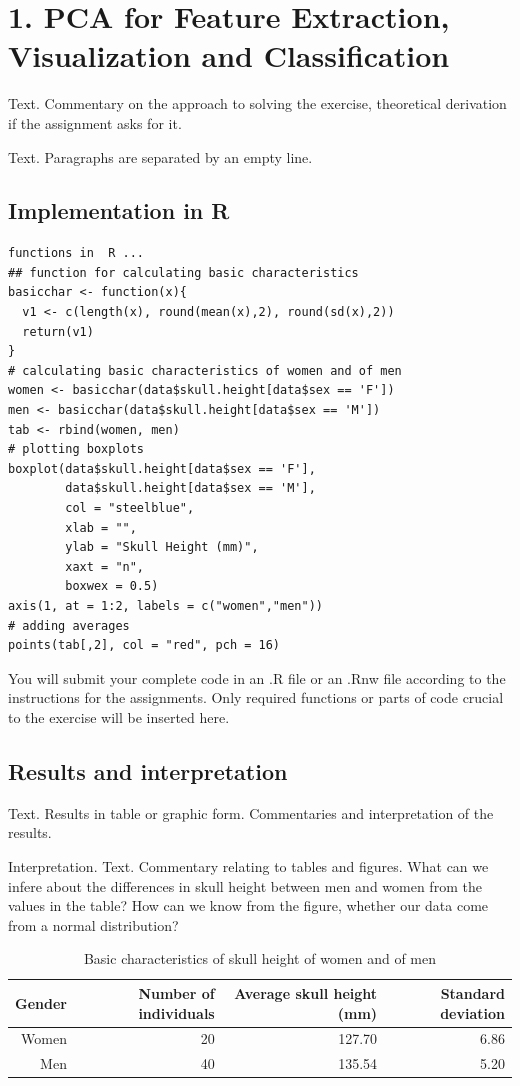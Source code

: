 \section*{1. PCA for Feature Extraction, Visualization and Classification}
\noindent Text. Commentary on the approach to solving the exercise, theoretical derivation if the assignment asks for it.

Text. Paragraphs are separated by an empty line. 

\subsection*{Implementation in R}
\begin{lstlisting}
functions in  R ...
## function for calculating basic characteristics
basicchar <- function(x){
  v1 <- c(length(x), round(mean(x),2), round(sd(x),2))
  return(v1)
}
# calculating basic characteristics of women and of men
women <- basicchar(data$skull.height[data$sex == 'F'])
men <- basicchar(data$skull.height[data$sex == 'M'])
tab <- rbind(women, men)
# plotting boxplots
boxplot(data$skull.height[data$sex == 'F'], 
        data$skull.height[data$sex == 'M'],
        col = "steelblue", 
        xlab = "",
        ylab = "Skull Height (mm)",
        xaxt = "n", 
        boxwex = 0.5)
axis(1, at = 1:2, labels = c("women","men"))
# adding averages
points(tab[,2], col = "red", pch = 16)
\end{lstlisting}

You will submit your complete code in an \textsf{.R} file or an \textsf{.Rnw} file according to the instructions for the assignments. Only required functions or parts of code crucial to the exercise will be inserted here.
\bigskip
\subsection*{Results and interpretation}
\noindent Text. Results in table or graphic form. Commentaries and interpretation of the results.

 Interpretation. Text. Commentary relating to tables and figures. What can we infere about the differences in skull height between men and women from the values in the table? How can we know from the figure, whether our data come from a normal distribution?

\begin{table}[ht]
\footnotesize
\centering

\begin{tabular}{r||rrr}
 Gender & Number of individuals & Average skull height (mm) & Standard deviation \\ 
 \hline \hline
Women & 20 & 127.70 & 6.86 \\ 
Men & 40 & 135.54 & 5.20 \\ 
\end{tabular}
\caption{Basic characteristics of skull height of women and of men}
\end{table}


